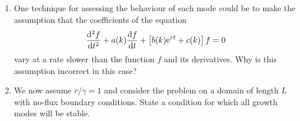 \documentclass[a4paper, 12pt]{article}
\begin{document}
\begin{enumerate}[label={\bf \arabic{*}.\;}, ref={\arabic{*}},itemsep=3ex, left=0ex]
{\begin{enumerate}[label=(\alph*)]
{\begin{align}
              \label{modeq}
              \fdd{f}{t} + a(k)\fd{f}{t} + \left[b(k)\e^{rt} + c(k)\right]f=0,
            \end{align}
            where
            \begin{align}
              &a(k) = \left[Dk^2 + \left(k^2 - r\right)\right],\quad b(k) =\alpha n_0 \beta\left(r-\gamma\right)k^2, \quad \beta = \frac{2n_0 c_0}{\mu + n_0^2},\\
              &c(k) =   \left(k^2 -r\right)D k^2.
            \end{align}
          }
        \item{One technique for assessing the behaviour of each mode could be to make the assumption that the coefficients of the equation
            \begin{equation}
              \fdd{f}{t} + a(k)\fd{f}{t} + \left[b(k)\e^{rt} + c(k)\right]f=0
            \end{equation}
            vary at a rate slower than the function $f$ and its derivatives. Why is this assumption incorrect in this case?
          }
        \item{We now assume $r/\gamma=1$ and consider the problem on a domain of length $L$ with no-flux boundary conditions. State a condition for which all growth modes will be stable.
          }


\end{enumerate}}
\end{enumerate}
\end{document}
